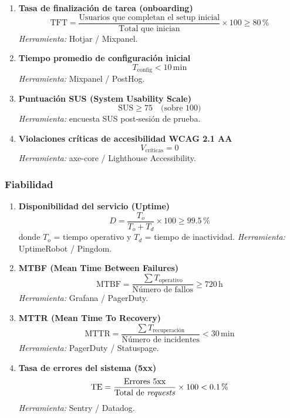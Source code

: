 \documentclass[12pt, a4paper]{article}
\begin{document}
\begin{enumerate}[leftmargin=*, label=\textbf{KPI \arabic*.}, start=10]

    \item \textbf{Tasa de finalización de tarea (onboarding)}
    \[
        \text{TFT} = \frac{\text{Usuarios que completan el setup inicial}}{\text{Total que inician}} \times 100 \geq 80\,\%
    \]
    \textit{Herramienta:} Hotjar / Mixpanel.

    \item \textbf{Tiempo promedio de configuración inicial}
    \[
        T_{\text{config}} < 10\,\text{min}
    \]
    \textit{Herramienta:} Mixpanel / PostHog.

    \item \textbf{Puntuación SUS (System Usability Scale)}
    \[
        \text{SUS} \geq 75 \quad \text{(sobre 100)}
    \]
    \textit{Herramienta:} encuesta SUS post-sesión de prueba.

    \item \textbf{Violaciones críticas de accesibilidad WCAG 2.1 AA}
    \[
        V_{\text{críticas}} = 0
    \]
    \textit{Herramienta:} axe-core / Lighthouse Accessibility.

\end{enumerate}

\subsubsection*{Fiabilidad}

\begin{enumerate}[leftmargin=*, label=\textbf{KPI \arabic*.}, start=14]

    \item \textbf{Disponibilidad del servicio (Uptime)}
    \[
        D = \frac{T_o}{T_o + T_d} \times 100 \geq 99.5\,\%
    \]
    donde $T_o$ = tiempo operativo y $T_d$ = tiempo de inactividad. \textit{Herramienta:} UptimeRobot / Pingdom.

    \item \textbf{MTBF (Mean Time Between Failures)}
    \[
        \text{MTBF} = \frac{\sum T_{\text{operativo}}}{\text{Número de fallos}} \geq 720\,\text{h}
    \]
    \textit{Herramienta:} Grafana / PagerDuty.

    \item \textbf{MTTR (Mean Time To Recovery)}
    \[
        \text{MTTR} = \frac{\sum T_{\text{recuperación}}}{\text{Número de incidentes}} < 30\,\text{min}
    \]
    \textit{Herramienta:} PagerDuty / Statuspage.

    \item \textbf{Tasa de errores del sistema (5xx)}
    \[
        \text{TE} = \frac{\text{Errores 5xx}}{\text{Total de \textit{requests}}} \times 100 < 0.1\,\%
    \]
    \textit{Herramienta:} Sentry / Datadog.

\end{enumerate}
\end{document}
